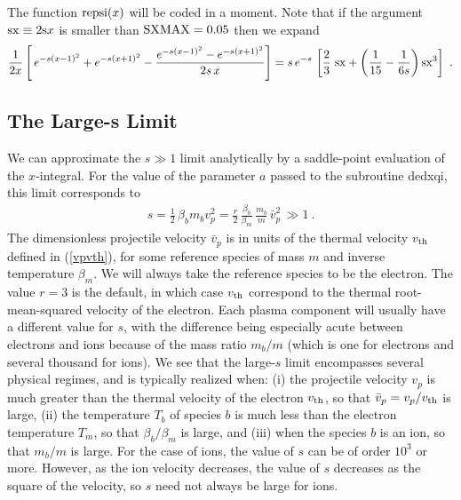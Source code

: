 \documentclass[preprint,12pt,eqsecnum,nofootinbib,amsmath,amssymb]{revtex4}
\begin{document}
\noindent
The function ${\rm repsi}(x)$ will be coded in a
moment. 
Note that if the argument ${\rm sx} \equiv 2 {\rm s} x$
is smaller than ${\rm SXMAX}=0.05$ then we expand 
\begin{eqnarray} 
  \frac{1}{2 x} 
  \left[\,e^{-s(x-1)^2} + e^{-s(x+1)^2} - 
  \frac{e^{-s(x-1)^2} - e^{-s(x+1)^2}}{2 s\, x} 
  \right]  = s\, e^{-s} \,
  \left[\frac{2}{3}~ {\rm sx} + \left(
  \frac{1}{15} - \frac{1}{6 s}\right){\rm sx}^3
  \right] \ .
\end{eqnarray}

\subsection{The Large-s Limit}

We can approximate the $s \gg 1$ limit analytically by
a saddle-point evaluation of the $x$-integral. For the 
value of the parameter $a$ passed to the subroutine dedxqi, 
this limit corresponds to
\begin{eqnarray}
  s = \frac{1}{2}\, \beta_b m_b v_p^2 =
  \frac{r}{2}\, \frac{\beta_b}{\beta_m} \,
  \frac{m_b}{m}\, {\bar v}_p^2 \, \gg 1 \ .
\end{eqnarray}
The dimensionless projectile velocity ${\bar v}_p$
is in units of the thermal velocity $v_{\rm th}$
defined in (\ref{vpvth}), for some reference species 
of mass $m$ and inverse temperature $\beta_m$. We will 
always take the reference species to be the electron. 
The value $r=3$ is the default, in which case $v_{\rm 
th}$ correspond to the thermal root-mean-squared 
velocity of the electron. Each plasma component will 
usually have a different value for $s$, with the
difference being especially acute between electrons
and ions because of the mass ratio $m_b/m$ (which is
one for electrons and several thousand for ions). We 
see that the large-$s$ limit encompasses several physical 
regimes, and is typically realized when: (i) the 
projectile velocity $v_p$ is much greater than the 
thermal velocity of the electron $v_{\rm th}$, so 
that ${\bar v}_p = v_p/v_{\rm th}$ is large, (ii) the 
temperature $T_b$ of species $b$ is much less than 
the electron temperature $T_m$, so that $\beta_b/
\beta_m$ is large, and (iii) when the species $b$ is
an ion, so that $m_b/m$ is large. For the case of ions,
the value of $s$ can be of order $10^3$ or more. However,
as the ion velocity decreases, the value of $s$ decreases 
as the square of the velocity, so $s$ need not always 
be large for ions. 
\end{document}
